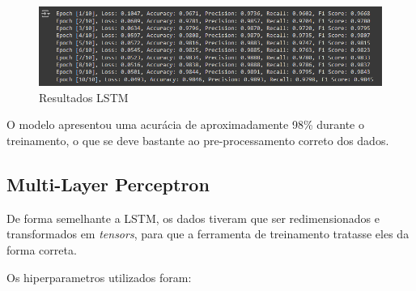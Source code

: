 \documentclass[conference]{IEEEtran}
\begin{document}
\begin{figure}[h!]
    \centering
    \includegraphics[width=\linewidth]{lstm-results.png}
    \caption{Resultados LSTM}
    \label{fig:result-lstm}
\end{figure}

O modelo apresentou uma acurácia de aproximadamente 98\% durante o treinamento, o que se deve bastante ao pre-processamento correto dos dados.

\subsection{Multi-Layer Perceptron}

De forma semelhante a LSTM, os dados tiveram que ser redimensionados e transformados em \textit{tensors}, para que a ferramenta de treinamento tratasse eles da forma correta.

Os hiperparametros utilizados foram:
\end{document}
